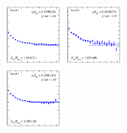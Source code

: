 \begin{figure}
  \includegraphics[width=0.28\textwidth]{figures/spectrum_a1g/with_tq/fits/fit_1.pdf}
  \includegraphics[width=0.28\textwidth]{figures/spectrum_a1g/with_tq/fits/fit_2.pdf}\\
  \includegraphics[width=0.28\textwidth]{figures/spectrum_a1g/with_tq/fits/fit_4.pdf}

\end{figure}
